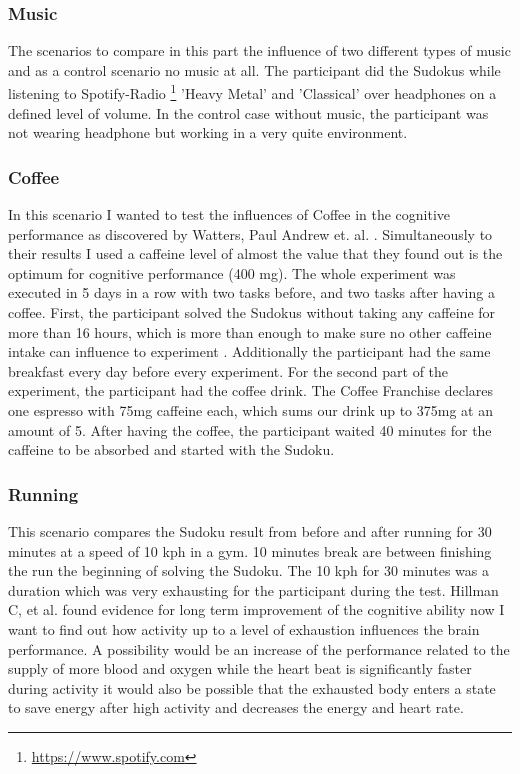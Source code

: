 \subsubsection{Music}
The scenarios to compare in this part the influence of two different types of music and as a control scenario no music at all. The participant did the Sudokus while listening to Spotify-Radio \footnote{\url{https://www.spotify.com}} 'Heavy Metal' and 'Classical' over headphones on a defined level of volume. In the control case without music, the participant was not wearing headphone but working in a very quite environment.

\subsubsection{Coffee}
In this scenario I wanted to test the influences of Coffee in the cognitive performance as discovered by Watters, Paul Andrew et. al. \cite{watters1997caffeine}. Simultaneously to their results I used a caffeine level of almost the value that they found out is the optimum for cognitive performance (400 mg). 
The whole experiment was executed in 5 days in a row with two tasks before, and two tasks after having a coffee. 
First, the participant solved the Sudokus without taking any caffeine for more than 16 hours, which is more than enough to make sure no other caffeine intake can influence to experiment \cite{liguori1997absorption}. Additionally the participant had the same breakfast every day before every experiment. 
For the second part of the experiment, the participant had the coffee drink. The Coffee Franchise declares one espresso with 75mg caffeine each, which sums our drink up to 375mg at an amount of 5. After having the coffee, the participant waited 40 minutes for the caffeine to be absorbed \cite{liguori1997absorption} and started with the Sudoku. 

\subsubsection{Running}
This scenario compares the Sudoku result from before and after running for 30 minutes at a speed of 10 kph in a gym. 10 minutes break are between finishing the run the beginning of solving the Sudoku. The 10 kph for 30 minutes was a duration which was very exhausting for the participant during the test. 
Hillman C, et al. \cite{hillman2008smart} found evidence for long term improvement of the cognitive ability now I want to find out how activity up to a level of exhaustion influences the brain performance. A possibility would be an increase of the performance related to the supply of more blood and oxygen while the heart beat is significantly faster during activity it would also be possible that the exhausted body enters a state to save energy after high activity and decreases the energy and heart rate. 

